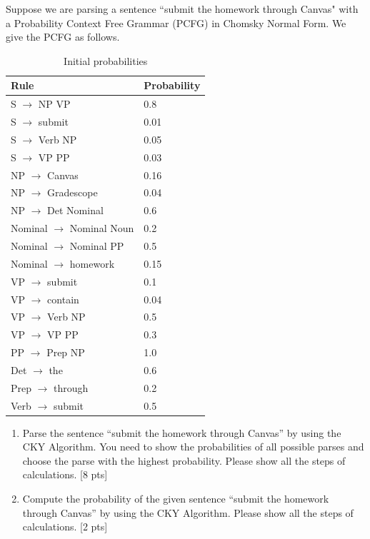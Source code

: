 Suppose we are parsing a sentence ``submit the homework through Canvas" with a Probability Context Free Grammar (PCFG) in Chomsky Normal Form. We give the PCFG as follows.

\begin{table}[h]
\centering
\begin{tabular}{|l|l|}
\hline
Rule & Probability  \\ \hline
S $\longrightarrow$ NP VP &  0.8       \\ \hline
S $\longrightarrow$ submit &    0.01      \\ \hline
S $\longrightarrow$ Verb NP &    0.05     \\ \hline
S $\longrightarrow$ VP PP &    0.03     \\ \hline
NP $\longrightarrow$ Canvas &    0.16     \\ \hline
NP $\longrightarrow$ Gradescope &    0.04     \\ \hline
NP $\longrightarrow$ Det Nominal &    0.6     \\ \hline
Nominal $\longrightarrow$ Nominal Noun &    0.2     \\ \hline
Nominal $\longrightarrow$ Nominal PP &    0.5     \\ \hline
Nominal $\longrightarrow$ homework &    0.15     \\ \hline
VP $\longrightarrow$ submit &    0.1     \\ \hline
VP $\longrightarrow$ contain &    0.04     \\ \hline
VP $\longrightarrow$ Verb NP &    0.5    \\ \hline
VP $\longrightarrow$ VP PP &    0.3    \\ \hline
PP $\longrightarrow$ Prep NP &    1.0    \\ \hline
Det $\longrightarrow$ the &    0.6    \\ \hline
Prep $\longrightarrow$ through &    0.2    \\ \hline
Verb $\longrightarrow$ submit &    0.5    \\ \hline


\end{tabular}\caption{Initial probabilities} \label{Tab:Initial}
\end{table}



\begin{enumerate}
    \item Parse the sentence  ``submit the homework through Canvas'' by using the CKY Algorithm. You need to show the probabilities of all possible parses and choose the parse with the highest probability. Please show all the steps of calculations. [8 pts]
    
    \item Compute the probability of the given sentence ``submit the homework through Canvas'' by using the CKY Algorithm. Please show all the steps of calculations.  [2 pts]
    

\end{enumerate}

